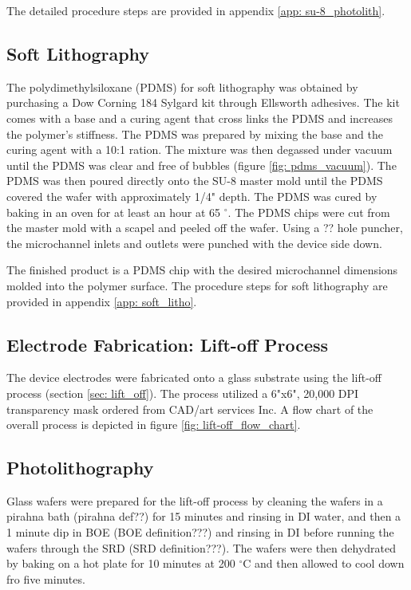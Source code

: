 The detailed procedure steps are provided in appendix \ref{app: su-8_photolith}.

\subsection*{Soft Lithography}
\par The polydimethylsiloxane (PDMS) for soft lithography was obtained by purchasing a Dow Corning 184 Sylgard kit through Ellsworth adhesives. The kit comes with a base and a curing agent that cross links the PDMS and increases the polymer's stiffness. The PDMS was prepared by mixing the base and the curing agent with a 10:1 ration. The mixture was then degassed under vacuum until the PDMS was clear and free of bubbles (figure \ref{fig: pdms_vacuum}). The PDMS was then poured directly onto the SU-8 master mold until the PDMS covered the wafer with approximately 1/4" depth. The PDMS was cured by baking in an oven for at least an hour at 65 $^\circ$. The PDMS chips were cut from the master mold with a scapel and peeled off the wafer. Using a ?? hole puncher, the microchannel inlets and outlets were punched with the device side down. 

\par The finished product is a PDMS chip with the desired microchannel dimensions molded into the polymer surface. The procedure steps for soft lithography are provided in appendix \ref{app: soft_litho}.


\subsection{Electrode Fabrication: Lift-off Process}
\par The device electrodes were fabricated onto a glass substrate using the lift-off process (section \ref{sec: lift_off}). The process utilized a 6"x6", 20,000 DPI transparency mask ordered from CAD/art services Inc. A flow chart of the overall process is depicted in figure \ref{fig: lift-off_flow_chart}.

\subsection*{Photolithography}
\par Glass wafers were prepared for the lift-off process by cleaning the wafers in a pirahna bath (pirahna def??) for 15 minutes and rinsing in DI water, and then a 1 minute dip in BOE (BOE definition???) and rinsing in DI before running the wafers through the SRD (SRD definition???). The wafers were then dehydrated by baking on a hot plate for 10 minutes at 200 $^\circ$C and then allowed to cool down fro five minutes. 

